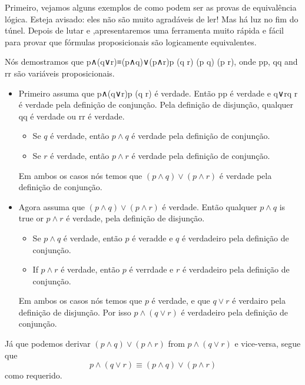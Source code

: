 Primeiro, vejamos alguns exemplos de como podem ser as provas de equivalência lógica. Esteja avisado: eles não são muito agradáveis ​​de ler! Mas há luz no fim do túnel. Depois de lutar  e ,apresentaremos uma ferramenta muito rápida e fácil para provar que fórmulas proposicionais são logicamente equivalentes.
\begin{example}
\label{exConjunctionDistributesOverDisjunction}
Nós demostramos que p∧(q∨r)≡(p∧q)∨(p∧r)p \wedge (q \vee r) \equiv (p \wedge q) \vee (p \wedge r), onde pp, qq and rr são variáveis proposicionais.

\begin{itemize}
\item Primeiro assuma que p∧(q∨r)p \wedge (q \vee r) é verdade. Então pp é verdade e q∨rq \vee r é verdade pela definição de conjunção. Pela definição de disjunção, qualquer qq é verdade ou rr é verdade.
\begin{itemize}
\item Se $q$ é verdade, então $p \wedge q$ é verdade pela definição de conjunção.
\item Se $r$ é verdade, então $p \wedge r$ é verdade pela definição de conjunção.
\end{itemize}
Em ambos os casos nós temos que $(p \wedge q) \vee (p \wedge r)$ é verdade pela definição de conjunção.

\item Agora assuma que $(p \wedge q) \vee (p \wedge r)$ é verdade. Então qualquer $p \wedge q$ is true or $p \wedge r$ é verdade, pela definição de disjunção.
\begin{itemize}
\item Se $p \wedge q$ é verdade, então $p$ é veradde e $q$ é verdadeiro pela definição de conjunção.
\item If $p \wedge r$ é verdade, então $p$ é verrdade e $r$ é verdadeiro pela definição de conjunção.
\end{itemize}
Em ambos os casos nós temos que $p$ é verdade, e que $q \vee r$ é verdairo pela definição de disjunção. Por isso $p \wedge (q \vee r)$ é verdadeiro pela definição de conjunção.
\end{itemize}

Já que podemos derivar $(p \wedge q) \vee (p \wedge r)$ from $p \wedge (q \vee r)$ e vice-versa, segue que
\[ p \wedge (q \vee r) \equiv (p \wedge q) \vee (p \wedge r)\]
como requerido.
\end{example}

